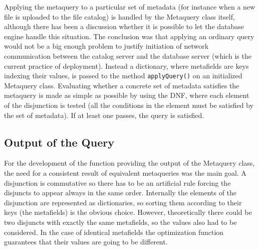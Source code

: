 Applying the metaquery to a particular
set of metadata (for instance when a new file is uploaded to the file catalog) is handled by the Metaquery class 
itself, although there has been a discussion whether it is possible to let the database engine handle this 
situation. The conclusion was that applying an ordinary query would not be a big enough problem to 
justify initiation of network communication between the catalog server and the database server (which is the 
current practice of deployment). Instead a dictionary, where metafields are keys indexing their values, is passed 
to the method \texttt{applyQuery()} on an initialized Metaquery class. Evaluating whether a concrete set of 
metadata satisfies the metaquery is made as simple as possible by using the DNF, where each element of the 
disjunction is tested (all the conditions in the element must be satisfied by the set of metadata). If at least
one passes, the query is satisfied.

\subsection{Output of the Query}

For the development of the function providing the output of the Metaquery class, the need for a consistent result of equivalent 
metaqueries was the main goal. A disjunction is commutative so there has to be an artificial rule forcing the 
disjuncts to appear always in the same order. Internally the elements of the disjunction are represented as 
dictionaries, so sorting them according to their keys (the metafields) is the obvious choice. However, theoretically
there could be two disjuncts with exactly the same metafields, so the values also had to be considered. In
the case of identical metafields the optimization function guarantees that their values are going to be different.